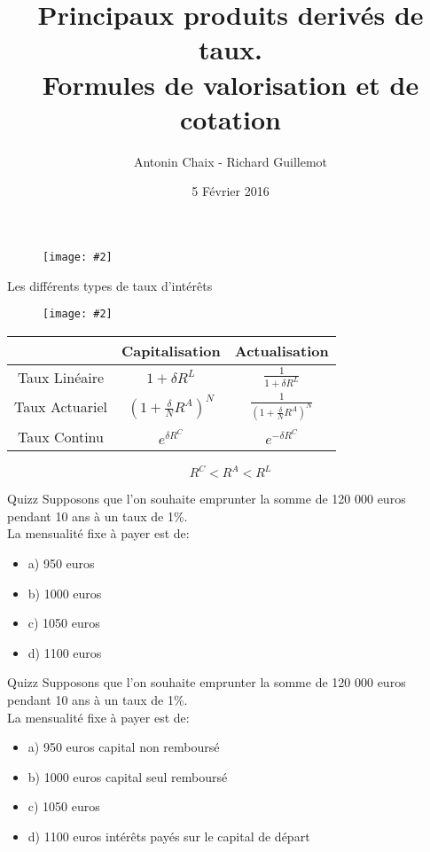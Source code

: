 \documentclass{beamer}
\title[Pdts dérivés de taux]{Principaux produits derivés de taux. \\ Formules de valorisation et de cotation}
\author{Antonin Chaix - Richard Guillemot}
\institute{Master IFMA}
\date{5 Février 2016}
\newcommand{\FIG}[2]{\texttt{[image: \#2]}}
\begin{document}
\begin{frame}
\titlepage
\begin{figure}[h]
\centering \FIG{5cm}{figures/UPMC_IFMA.jpg}
\end{figure}
\end{frame}

\begin{frame}{Les différents types de taux d'intérêts}
\begin{figure}[h]
\centering \FIG{7cm}{figures/capi_actu.png}
\end{figure}
\begin{center}
\begin{tabular}{|c|c|c|}
\hline
&\textbf{C}apitalisation&\textbf{A}ctualisation \\
\hline
  Taux Linéaire & $1+\delta R^L$ &  $\frac{1}{1+\delta R^L}$ \\
  Taux Actuariel & $(1+\frac{\delta}{N}R^A)^N$ &  $\frac{1}{(1+\frac{\delta}{N}R^A)^N}$ \\
  Taux Continu & $e^{\delta R^C}$ & $e^{-\delta R^C}$ \\
\hline
\end{tabular}
\end{center}
\[
	R^C < R^A < R^L
\]
\end{frame}

\begin{frame}{Quizz}
Supposons que l'on souhaite emprunter la somme de 120 000 euros pendant 10 ans à un taux de 1\%.\\

\vspace{0.5cm}
La mensualité fixe à payer est de:
\begin{itemize}
\item a) 950 euros
\item b) 1000 euros
\item c) 1050 euros
\item d) 1100 euros
\end{itemize}

\end{frame}

\begin{frame}{Quizz}
Supposons que l'on souhaite emprunter la somme de 120 000 euros pendant 10 ans à un taux de 1\%.\\

\vspace{0.5cm}
La mensualité fixe à payer est de:
\begin{itemize}
\item a) 950 euros \textbf{\color{red}{FAUX}} capital non remboursé
\item b) 1000 euros \textbf{\color{red}{FAUX}} capital seul remboursé
\item c) 1050 euros \textbf{\color{green}{VRAI}}
\item d) 1100 euros \textbf{\color{red}{VRAI}} intérêts payés sur le capital de départ
\end{itemize}

\end{frame}
\end{document}
